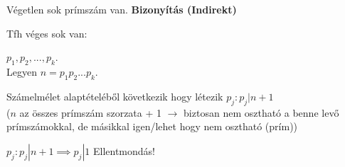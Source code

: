 \begin{frame}
  \begin{tcolorbox}[title={Tétel: Eukleidész tétele}]
    Végetlen sok prímszám van.
  \tcblower
    \textbf{Bizonyítás (Indirekt)}
    \mmedskip
    
    Tfh véges sok van:\\
    \msmallskip
    
    $p_1, p_2, ... ,p_k$.\\
    Legyen $n = p_1p_2...p_k$.\\
    \msmallskip
    
    Számelmélet alaptételéből következik hogy létezik $p_j : p_j | n + 1$\\
    ($n$ az összes prímszám szorzata + 1 $\rightarrow$ biztosan nem osztható a benne levő prímszámokkal, de másikkal igen/lehet hogy nem osztható (prím))\\
    \msmallskip
    
    $p_j : p_j | n + 1 \implies p_j | 1$ Ellentmondás!
  \end{tcolorbox}
\end{frame}

